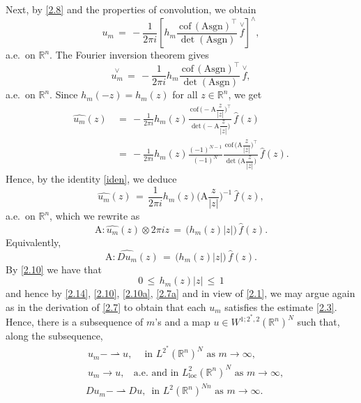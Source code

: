 \documentclass{amsart}
\theoremstyle{definition}
\numberwithin{equation}{section}
\begin{document}
Next, by \eqref{2.8} and the properties of convolution, we obtain
\[
u_m\, =\, -\frac{1}{2\pi i} 
\left[ 
h_m \frac{ \ {\textrm{cof}} \,({\textrm{A}} {\textrm{sgn}} )^\top }{ \det ({\textrm{A}} {\textrm{sgn}}) }\, \overset{\vee}{f}
\right]^{\wedge} ,
\]
a.e.\ on ${\mathbb{R}}^n$. The Fourier inversion theorem gives
\[
\overset{\vee}{u_m}\, =\, -\frac{1}{2\pi i}  h_m 
\frac{ \ {\textrm{cof}} \,({\textrm{A}} {\textrm{sgn}} )^\top }{ \det ({\textrm{A}} {\textrm{sgn}}) }\, \overset{\vee}{f},
\]
a.e.\ on ${\mathbb{R}}^n$. Since $h_m(-z)=h_m(z)$ for all $z\in {\mathbb{R}}^n$, we get
\begin{align}
\widehat{u_m} (z)\, &=\, -\frac{1}{2\pi i}  h_m(z)
\frac{ \ {\textrm{cof}}\, \Big( -{\textrm{A}} \dfrac{z}{|z|} \Big)^\top }{ \det \Big(-{\textrm{A}} \dfrac{z}{|z|} \Big) }\, \widehat{f}(z) \nonumber\\
&=\, -\frac{1}{2\pi i}  h_m(z)\frac{ (-1)^{N-1}}{ (-1)^{N}}
\frac{\ {\textrm{cof}}\, \Big( {\textrm{A}} \dfrac{z}{|z|} \Big)^\top }{ \det \Big({\textrm{A}} \dfrac{z}{|z|} \Big) }\, \widehat{f}(z) . \nonumber
\end{align}
Hence, by the identity \eqref{iden}, we deduce
\[
\widehat{u_m} (z)\, =\, \frac{1}{2\pi i}  h_m(z) \Big( {\textrm{A}} \dfrac{z}{|z|} \Big)^{-1}\, \widehat{f}(z) ,
\]
a.e.\ on ${\mathbb{R}}^n$, which we rewrite as
\begin{equation} \label{2.10}
 {\textrm{A}} :\widehat{u_m} (z) {\otimes} 2\pi i z\, =\, \big(h_m(z)|z|\big)\, \widehat{f}(z).
\end{equation}
Equivalently,
\begin{equation} \label{2.10a}
{\textrm{A}} : \widehat{Du_m}(z)\, =\, \big(h_m(z)|z|\big)\, \widehat{f}(z).
\end{equation}
By \eqref{2.10} we have that 
\begin{equation} \label{2.14}
0 \, \leq \, h_m(z)|z| \, \leq\, 1
\end{equation}
and hence by \eqref{2.14}, \eqref{2.10}, \eqref{2.10a}, \eqref{2.7a} and in view of \eqref{2.1}, we may argue again as in the derivation of \eqref{2.7} to obtain that each $u_m$ satisfies the estimate \eqref{2.3}. Hence, there is a subsequence of $m$'s and a map $u\in W^{1;2^*\!,2}({\mathbb{R}}^n)^N$ such that, along the subsequence,
\begin{align}
 &\ u_m{-\!\!\!\!\rightharpoonup} u,\ \ \ \ \text{ in $L^{2^*}({\mathbb{R}}^n)^N$ as } m{\rightarrow} \infty, \nonumber\\
 &\ u_m{\longrightarrow} u,\ \ \ \ \text{a.e.\ and in $L^{2}_{\text{loc}}({\mathbb{R}}^n)^N$ as } m{\rightarrow} \infty, \nonumber\\
 &Du_m{-\!\!\!\!\rightharpoonup} Du,\, \text{ in $L^{2}({\mathbb{R}}^n)^{Nn}$ as } m{\rightarrow} \infty. \nonumber
\end{align}
\end{document}
